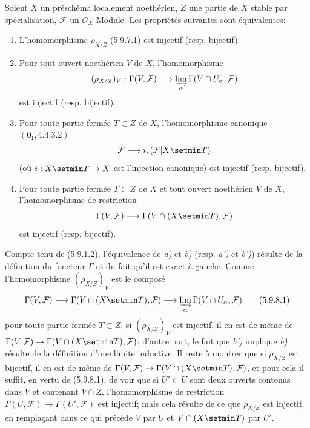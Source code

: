 \begin{proposition}[5.9.8]
Soient $X$ un préschéma localement noethérien, $Z$ une partie de $X$ stable
par spécialisation, $\mathcal F$ un $\mathcal O_X$-Module. Les propriétés
suivantes sont équivalentes:
\begin{enumerate}
\item[\textup{a)}] L'homomorphisme $\rho_{X/Z}$ \textup{(5.9.7.1)} est injectif
(\textup{resp.} bijectif).
\item[\textup{b)}] Pour tout ouvert noethérien $V$ de $X$, l'homomorphisme
\[
(\rho_{X/Z})_V:\Gamma(V,\mathcal F)\longrightarrow
\varinjlim_\alpha\Gamma(V\cap U_\alpha,\mathcal F)
\]
est injectif (\textup{resp.} bijectif).
\item[\textup{a')}] Pour toute partie fermée $T\subset Z$ de $X$, l'homomorphisme
canonique $(\mathbf{0}_{\mathrm I},4.4.3.2)$
\[
\mathcal F\longrightarrow i_*(\mathcal F|X\setmin T)
\]
(où $i:X\setmin T\to X$ est l'injection canonique) est injectif
(\textup{resp.} bijectif).
\item[\textup{b')}] Pour toute partie fermée $T\subset Z$ de $X$ et tout ouvert
noethérien $V$ de $X$, l'homomorphisme de restriction
\[
\Gamma(V,\mathcal F)\longrightarrow
\Gamma(V\cap(X\setmin T),\mathcal F)
\]
est injectif (\textup{resp.} bijectif).
\end{enumerate}
\end{proposition}

Compte tenu de (5.9.1.2), l'équivalence de \emph{a)} et \emph{b)} (resp. \emph{a')} et \emph{b')})
résulte de
la définition du foncteur $\Gamma$ et du fait qu'il est exact à gauche.
Comme l'homomorphisme $(\rho_{X/Z})_V$ est le composé
\begin{equation}
\Gamma(V,\mathcal F)\longrightarrow
\Gamma(V\cap(X\setmin T),\mathcal F)\longrightarrow
\varinjlim_\alpha\Gamma(V\cap U_\alpha,\mathcal F)
\tag{5.9.8.1}\label{IV.2.s5.9.8.1-fr}
\end{equation}
pour toute partie fermée $T\subset Z$, si $(\rho_{X/Z})_V$ est injectif, il
en est de même de
$\Gamma(V,\mathcal F)\to\Gamma(V\cap(X\setmin T),\mathcal F)$; d'autre part, le
fait que \emph{b')} implique \emph{b)} résulte de la définition d'une limite inductive. Il
reste à montrer que si $\rho_{X/Z}$ est bijectif, il en est de même de
$\Gamma(V,\mathcal F)\to\Gamma(V\cap(X\setmin T),\mathcal F)$, et pour cela il
suffit, en vertu de (5.9.8.1), de voir que si $U'\subset U$ sont deux
ouverts contenus dans $V$ et contenant $V\cap Z$, l'homomorphisme de
restriction $\Gamma(U,\mathcal F)\to\Gamma(U',\mathcal F)$ est injectif;
mais cela résulte de ce que $\rho_{X/Z}$ est injectif, en remplaçant dans ce
qui précède $V$ par $U$ et $V\cap(X\setmin T)$ par $U'$.

